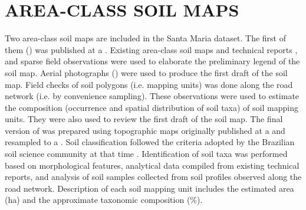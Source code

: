 
\section{AREA-CLASS SOIL MAPS}
\label{sec:chap05-soil-maps}

Two area-class soil maps are included in the Santa Maria dataset. The first of them (\soilOld{}) was published 
at a  \cite{AzolinEtAl1988}. Existing area-class soil maps and technical reports 
\cite{Brasil1973, Azolin1977, MacielEtAl1987a, MacielEtAl1987, AbraoEtAl1988}, and sparse field observations 
were used to elaborate the preliminary legend of the soil map. Aerial photographs () were used to 
produce the first draft of the soil map. Field checks of soil polygons (i.e. mapping units) was done along the 
road network (i.e. by convenience sampling). These observations were used to estimate the composition 
(occurrence and spatial distribution of soil taxa) of soil mapping units. They were also used to review the 
first draft of the soil map. The final version of \soilOld{} was prepared using topographic maps originally 
published at a  and resampled to a . Soil classification followed the criteria 
adopted by the Brazilian soil science community at that time \cite{Brasil1973, CamargoEtAl1982, Carvalho1982, 
LemosEtAl1982, OlmosEtAl1982}. Identification of soil taxa was performed based on morphological features, 
analytical data compiled from existing technical reports, and analysis of soil samples collected from soil 
profiles observed along the road network. Description of each soil mapping unit includes the estimated area 
(\si{\hectare}) and the approximate taxonomic composition (\si{\percent}).

